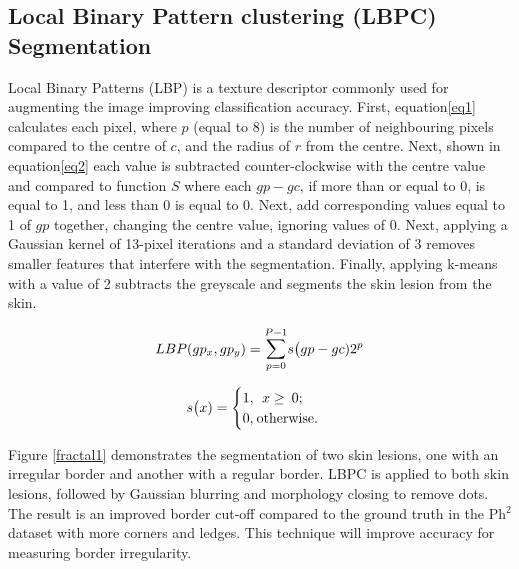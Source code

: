\subsection{Local Binary Pattern clustering (LBPC) Segmentation}
Local Binary Patterns (LBP) is a texture descriptor commonly used for augmenting the image improving classification accuracy\cite{Pereira2020, Kaya2016}. First, equation\ref{eq1} calculates each pixel, where $p$ (equal to 8) is the number of neighbouring pixels compared to the centre of $c$, and the radius of $r$ from the centre. Next, shown in equation\ref{eq2} each value is subtracted counter-clockwise with the centre value and compared to function $S$ where each $gp - gc$, if more than or equal to 0, is equal to 1, and less than 0 is equal to 0. Next, add corresponding values equal to 1 of $gp$ together, changing the centre value, ignoring values of 0. Next, applying a Gaussian kernel of 13-pixel iterations and a standard deviation of 3 removes smaller features that interfere with the segmentation. Finally, applying k-means with a value of 2 subtracts the greyscale and segments the skin lesion from the skin.

\begin{equation} \label{eq1}
LBP(gp_x, gp_y) = \mathlarger{\sum}_{p=0}^{P-1}s\big(gp - gc)2^p
\end{equation}

\begin{equation} \label{eq2}
s\big(x) = 
\begin{cases}
1,\:\:x\geq\:0; \\
0,\:$otherwise$.
\end{cases}
\end{equation}

Figure \ref{fractal1} demonstrates the segmentation of two skin lesions, one with an irregular border and another with a regular border. LBPC is applied to both skin lesions, followed by Gaussian blurring and morphology closing to remove dots. The result is an improved border cut-off compared to the ground truth in the Ph$^2$ dataset with more corners and ledges. This technique will improve accuracy for measuring border irregularity\cite{Pereira2020}.

